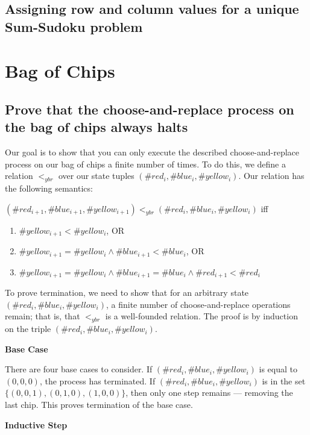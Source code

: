 \documentclass{article}
\begin{document}
\subsection{Assigning row and column values for a unique Sum-Sudoku problem}

\section{Bag of Chips}

\subsection{Prove that the choose-and-replace process on the bag of chips always halts}

\noindent Our goal is to show that you can only execute the described choose-and-replace process on our bag of chips a finite number of times. To do this, we define a relation $<_{ybr}$ over our state tuples $(\#red_i, \#blue_i, \#yellow_i)$. Our relation has the following semantics:

\medskip
\noindent $(\#red_{i + 1}, \#blue_{i + 1}, \#yellow_{i + 1}) <_{ybr} (\#red_i, \#blue_i, \#yellow_i)$ iff

\begin{enumerate}
  \item $\#yellow_{i + 1} < \#yellow_i$, OR
  \item $\#yellow_{i + 1} = \#yellow_i \land \#blue_{i + 1} < \#blue_i$, OR
  \item $\#yellow_{i + 1} = \#yellow_i \land \#blue_{i + 1} = \#blue_i \land \#red_{i + 1} < \#red_i$
\end{enumerate}

\noindent To prove termination, we need to show that for an arbitrary state $(\#red_i, \#blue_i, \#yellow_i)$, a finite number of choose-and-replace operations remain; that is, that $<_{ybr}$ is a well-founded relation. The proof is by induction on the triple $(\#red_i, \#blue_i, \#yellow_i)$.

\medskip
\noindent \textbf{Base Case}

\medskip
\noindent There are four base cases to consider. If $(\#red_i, \#blue_i, \#yellow_i)$ is equal to $(0, 0, 0)$, the process has terminated. If $(\#red_i, \#blue_i, \#yellow_i)$ is in the set $\{(0, 0, 1), (0, 1, 0), (1, 0, 0)\}$, then only one step remains — removing the last chip. This proves termination of the base case.

\medskip
\noindent \textbf{Inductive Step}
\end{document}
